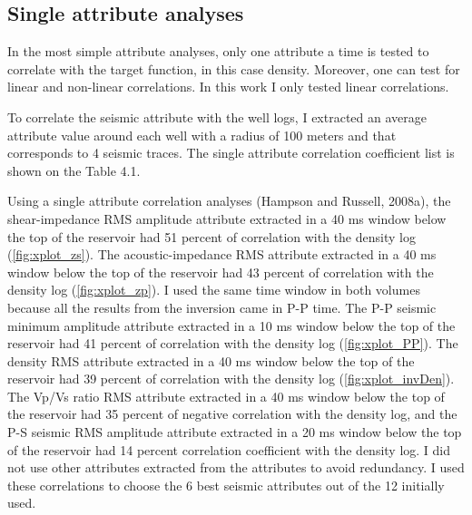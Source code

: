 \subsection{Single attribute analyses}

In the most simple attribute analyses, only one attribute a time is tested to correlate with the target function, in this case density. Moreover, one can test for linear and non-linear correlations. In this work I only tested linear correlations. 

To correlate the seismic attribute with the well logs, I extracted an average attribute value around each well with a radius of 100 meters and that corresponds to 4 seismic traces. The single attribute correlation coefficient list is shown on the Table 4.1.






	Using a single attribute correlation analyses (Hampson and Russell, 2008a), the shear-impedance RMS amplitude attribute extracted in a 40 ms window below the top of the reservoir had 51 percent of correlation with the density log (\ref{fig:xplot_zs}). The acoustic-impedance RMS attribute extracted in a 40 ms window below the top of the reservoir had 43 percent of correlation with the density log (\ref{fig:xplot_zp}). I used the same time window in both volumes because all the results from the inversion came in P-P time. The P-P seismic minimum amplitude attribute extracted in a 10 ms window below the top of the reservoir had 41 percent of correlation with the density log (\ref{fig:xplot_PP}). The density RMS attribute extracted in a 40 ms window below the top of the reservoir had 39 percent of correlation with the density log (\ref{fig:xplot_invDen}). The Vp/Vs ratio RMS attribute extracted in a 40 ms window below the top of the reservoir had 35 percent of negative correlation with the density log, and the P-S seismic RMS amplitude attribute extracted in a 20 ms window below the top of the reservoir had 14 percent correlation coefficient with the density log. I did not use other attributes extracted from the attributes to avoid redundancy. I used these correlations to choose the 6 best seismic attributes out of the 12 initially used. 

